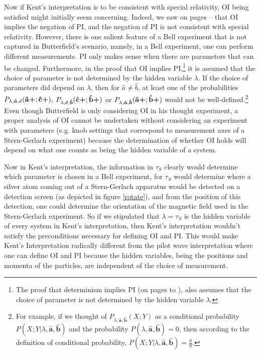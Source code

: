 Now if Kent's interpretation is to be consistent with special relativity, OI being satisfied might initially seem concerning. Indeed, we saw on pages \pageref{OI}--\pageref{OIPIproofend} that OI implies the negation of PI, and the negation of PI is not consistent with special relativity. However, there is one salient feature of a Bell experiment that is not captured in Butterfield's scenario, namely, in a Bell experiment, one can perform different measurements.  PI only makes sense when there are parameters that can be changed. Furthermore, in the proof that OI implies PI,\footnote{The proof  that determinism implies PI (on pages \pageref{bellinequality2} to \pageref{PIdeterminism}), also assumes that the choice of parameter is not determined by the hidden variable $\lambda$.} it is assumed that the choice of parameter is not determined by the hidden variable $\lambda$. If the choice of parameters did depend on $\lambda$, then for $\hat{a}\neq\hat{b}$, at least one of the probabilities $P_{\lambda,\bm{\hat{a}},\bm{\hat{c}}}(\vb{\hat{{a}}}\bm{+};\vb{\hat{{c}}}\bm{+}),$ $P_{\lambda,\bm{\hat{c}},\bm{\hat{b}}}(\vb{\hat{{c}}}\bm{+};\vb{\hat{{b}}}\bm{+})$ or $P_{\lambda,\bm{\hat{a}},\bm{\hat{b}}}(\vb{\hat{{a}}}\bm{+};\vb{\hat{{b}}}\bm{+})$ would not be well-defined.\footnote{For example, if we thought of $P_{\lambda,\bm{\hat{a}},\bm{\hat{b}}}(X;Y)$ as a conditional probability $P(X;Y|\lambda,\bm{\hat{a}},\bm{\hat{b}})$ and the probability $P(\lambda,\bm{\hat{a}},\bm{\hat{b}})=0$, then according to the definition of conditional probability,  $P(X;Y|\lambda,\bm{\hat{a}},\bm{\hat{b}})=\frac{0}{0}.$} Even though Butterfield is only considering OI in his thought experiment, a proper analysis of OI cannot be undertaken without considering an experiment with parameters (e.g. knob settings that correspond to measurement axes of a Stern-Gerlach experiment) because the determination of whether OI holds will depend on what one counts as being the hidden variable of a system. 

Now in Kent's interpretation, the information in $\tau_S$ clearly would determine which parameter is chosen in a Bell experiment, for $\tau_S$ would determine where a silver atom coming out of a Stern-Gerlach apparatus would be detected on a detection screen (as depicted in figure \ref{rotate}), and from the position of this detection, one could determine the orientation of the magnetic field used in the Stern-Gerlach experiment. So if we stipulated that $\lambda=\tau_S$ is the hidden variable of every system in Kent's interpretation, then Kent's interpretation wouldn't satisfy the preconditions necessary for defining OI and PI. This would make Kent's Interpretation radically different from the pilot wave interpretation where one can define OI and PI because the hidden variables, being the positions and momenta of the particles, are independent of the choice of measurement.

